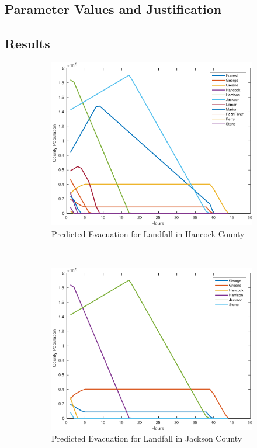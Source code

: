 \documentclass[titlepage]{article}
\begin{document}
  \subsection{Parameter Values and Justification}

  \subsection{Results}

    \begin{figure}
      \center
      \begin{subfigure}[b]{0.5\textwidth}
        \center
        \includegraphics[width=\linewidth]{figures/pred_hancock-crop.pdf}
        \caption{Predicted Evacuation for Landfall in Hancock County}
      \end{subfigure}~
      \begin{subfigure}[b]{0.5\textwidth}
        \center
        \includegraphics[width=\linewidth]{figures/pred_jackson-crop.pdf}
        \caption{Predicted Evacuation for Landfall in Jackson County}
      \end{subfigure}
      \caption{}
    \end{figure}
\end{document}
